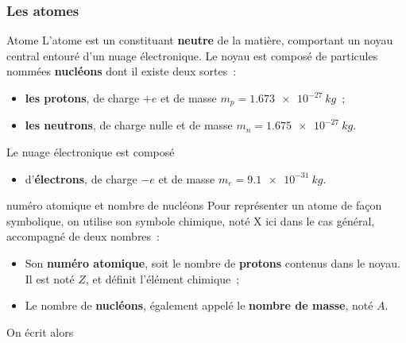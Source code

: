 \documentclass[../main/main.tex]{subfiles}
\begin{document}
\subsubsection{Les atomes}
\begin{tcbraster}[raster columns=2, raster equal height=rows]
    
    \begin{defi}[label=def:atome]{Atome}
        L'atome est un constituant \textbf{neutre} de la matière, comportant un
        noyau central entouré d'un nuage électronique. Le noyau est composé de
        particules nommées \textbf{nucléons} dont il existe deux sortes~:
        \begin{itemize}
            \item \textbf{les protons}, de charge $+e$ et de masse $m_p =
                \SI{1.673e-27}{kg}$~;
            \item \textbf{les neutrons}, de charge nulle et de masse $m_n =
                \SI{1.675e-27}{kg}$.
        \end{itemize}
        Le nuage électronique est composé
        \begin{itemize}
            \item d'\textbf{électrons}, de charge $-e$ et de masse $m_e =
                \SI{9.1e-31}{kg}$.
        \end{itemize}
    \end{defi}
    \begin{defi}[label=def:numéroatomique]{numéro atomique et nombre de nucléons}
        Pour représenter un atome de façon symbolique, on utilise son symbole
        chimique, noté X ici dans le cas général, accompagné de deux nombres~:
        \begin{itemize}
            \item Son \textbf{numéro atomique}, soit le nombre de \textbf{protons}
                contenus dans le noyau. Il est noté $Z$, et définit l'élément
                chimique~;
            \item Le nombre de \textbf{nucléons}, également appelé le \textbf{nombre
                de masse}, noté $A$. 
        \end{itemize}
        On écrit alors

    \end{defi}


\end{tcbraster}
\end{document}
